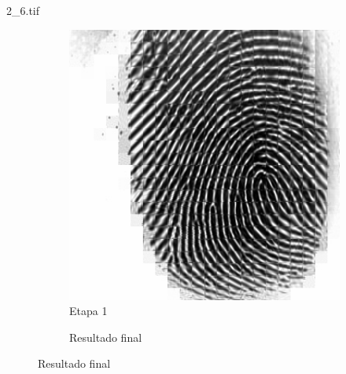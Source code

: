 \documentclass{beamer}
\begin{document}
\begin{frame}{2\_6.tif}
\begin{figure}
\begin{subfigure}[!ht]{0.32\textwidth}
                \includegraphics[width=\columnwidth]{Fingerprints/2_6_intermediate.jpg}
                \caption{Etapa 1}
            \end{subfigure}
            \begin{subfigure}[!ht]{0.32\textwidth}
                \caption{Resultado final}
            \end{subfigure}
        \end{figure}
    \end{frame}
\end{document}
